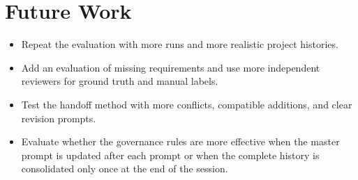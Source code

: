\section{Future Work}
\label{sec:discussion-future}

\begin{itemize}[leftmargin=*]

\item Repeat the evaluation with more runs and more realistic project
histories.

\item Add an evaluation of missing requirements and use more independent
reviewers for ground truth and manual labels.

\item Test the handoff method with more conflicts, compatible additions, and
clear revision prompts.

\item Evaluate whether the governance rules are more effective when the master
prompt is updated after each prompt or when the complete history is
consolidated only once at the end of the session.


\end{itemize}
